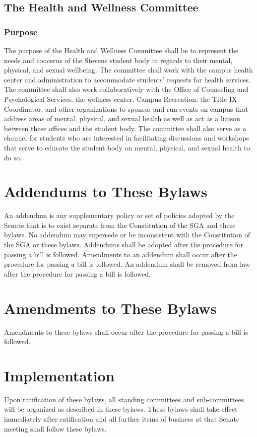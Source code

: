 \documentclass[12pt]{scrreprt}
\begin{document}
\section{The Health and Wellness Committee}

\subsection{Purpose}
The purpose of the Health and Wellness Committee shall be to represent the needs and
concerns of the Stevens student body in regards to their mental, physical, and sexual
wellbeing. The committee shall work with the campus health center and administration to
accommodate students’ requests for health services. The committee shall also work
collaboratively with the Office of Counseling and Psychological Services, the wellness
center, Campus Recreation, the Title IX Coordinator, and other organizations to sponsor
and run events on campus that address areas of mental, physical, and sexual health as
well as act as a liaison between these offices and the student body. The committee shall also serve as a channel for students who are interested in facilitating discussions and workshops that serve to educate the student body on mental, physical, and sexual health to do so. 

\chapter{Addendums to These Bylaws} \label{sec:addendums}
An addendum is any supplementary policy or set of policies adopted by the Senate that is to exist separate from the Constitution of the SGA and these bylaws. No addendum may supersede or be inconsistent with the Constitution of the SGA or these bylaws. 
Addendums shall be adopted after the procedure for passing a bill is followed. 
Amendments to an addendum shall occur after the procedure for passing a bill is followed. An addendum shall be removed from law after the procedure for passing a bill is followed.

\chapter{Amendments to These Bylaws} \label{sec:amendments}
Amendments to these bylaws shall occur after the procedure for passing a bill 
is followed. 

\chapter{Implementation}
Upon ratification of these bylaws, all standing committees and sub-committees 
will be organized as described in these bylaws. These bylaws shall take effect 
immediately after ratification and all further items of business at that 
Senate meeting shall follow these bylaws. 
\end{document}
